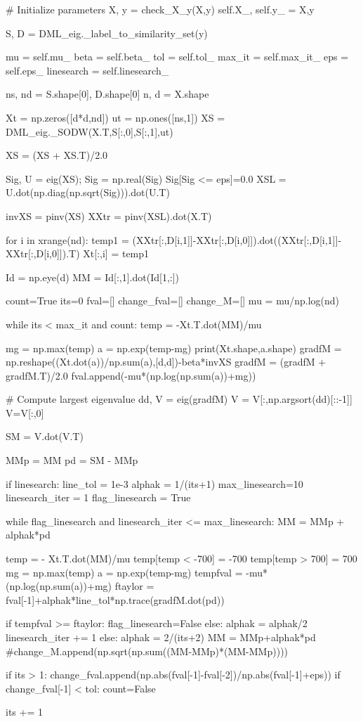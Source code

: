 \begin{DoxyVerb}# Initialize parameters
X, y = check_X_y(X,y)
self.X_, self.y_ = X,y

S, D = DML_eig._label_to_similarity_set(y)

mu = self.mu_
beta = self.beta_
tol = self.tol_
max_it = self.max_it_
eps = self.eps_
linesearch = self.linesearch_

ns, nd = S.shape[0], D.shape[0]
n, d = X.shape

Xt = np.zeros([d*d,nd])
ut = np.ones([ns,1])
XS = DML_eig._SODW(X.T,S[:,0],S[:,1],ut)

XS = (XS + XS.T)/2.0

Sig, U = eig(XS);
Sig = np.real(Sig)
Sig[Sig <= eps]=0.0
XSL = U.dot(np.diag(np.sqrt(Sig))).dot(U.T)

invXS = pinv(XS)
XXtr = pinv(XSL).dot(X.T)

for i in xrange(nd):
    temp1 = (XXtr[:,D[i,1]]-XXtr[:,D[i,0]]).dot((XXtr[:,D[i,1]]-XXtr[:,D[i,0]]).T)
    Xt[:,i] = temp1

Id = np.eye(d)
MM = Id[:,1].dot(Id[1,:])

count=True
its=0
fval=[]
change_fval=[]
change_M=[]
mu = mu/np.log(nd)

while its < max_it and count:
    temp = -Xt.T.dot(MM)/mu

    mg = np.max(temp)
    a = np.exp(temp-mg)
    print(Xt.shape,a.shape)
    gradfM = np.reshape((Xt.dot(a))/np.sum(a),[d,d])-beta*invXS
    gradfM = (gradfM + gradfM.T)/2.0
    fval.append(-mu*(np.log(np.sum(a))+mg))

    # Compute largest eigenvalue
    dd, V = eig(gradfM)
    V = V[:,np.argsort(dd)[::-1]]
    V=V[:,0]

    SM = V.dot(V.T)

    MMp = MM
    pd = SM - MMp

    if linesearch:
line_tol = 1e-3
alphak = 1/(its+1)
max_linesearch=10
linesearch_iter = 1
flag_linesearch = True

while flag_linesearch and linesearch_iter <= max_linesearch:
    MM = MMp + alphak*pd

    temp = - Xt.T.dot(MM)/mu
    temp[temp < -700] = -700
    temp[temp > 700] = 700
    mg = np.max(temp)
    a = np.exp(temp-mg)
    tempfval = -mu*(np.log(np.sum(a))+mg)
    ftaylor = fval[-1]+alphak*line_tol*np.trace(gradfM.dot(pd))

    if tempfval >= ftaylor:
        flag_linesearch=False
    else:
        alphak = alphak/2
    linesearch_iter += 1
    else:
alphak = 2/(its+2)
MM = MMp+alphak*pd
#change_M.append(np.sqrt(np.sum((MM-MMp)*(MM-MMp))))

    if its > 1:
change_fval.append(np.abs(fval[-1]-fval[-2])/np.abs(fval[-1]+eps))
if change_fval[-1] < tol:
    count=False

    its += 1
\end{DoxyVerb}
